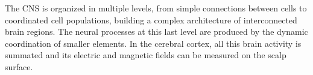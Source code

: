 The CNS is organized in multiple levels, from simple connections between cells to coordinated cell populations, building a complex architecture of interconnected brain regions. The neural processes at this last level are produced by the dynamic coordination of smaller elements. In the cerebral cortex, all this brain activity is summated and its electric and magnetic fields can be measured on the scalp surface. 

\

